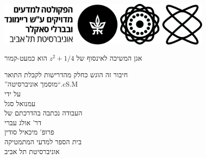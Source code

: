 \documentclass[11pt,titlepage]{article}
\begin{document}
\begin{titlepage}
    \begin{center}
        \vspace*{0.05cm}
        \includegraphics[width=0.8\textwidth]{figures/Logo_Exact_Sciences_Hebrew_Black.jpeg}\\
        \vspace{3cm}
        {\huge אגן המשיכה לאינסוף של $z^2+1/4$ הוא כמעט-קמור \par}
        \vspace{1cm}
        {\large חיבור זה הוגש כחלק מהדרישות לקבלת התואר\\
        \textquotedblright מוסמך אוניברסיטה\textquotedblleft\text{ }\textendash \text{ }.cS.M}\\
        \vspace{2cm}
        { על ידי}\\
        \vspace{0.3cm}
        {\large {עמנואל סגל}}\\
        \vspace{1.5cm}
        {\large העבודה נכתבה בהדרכתם של}\\
        \vspace{0.3cm}
        {\huge דר' אולג עברי} \\
        {\huge פרופ' מיכאיל סודין\\
        \vspace{1cm}
        {\Large בית הספר למדעי המתמטיקה \\ אוניברסיטת תל אביב}}
    \end{center}
\end{titlepage}
\end{document}
